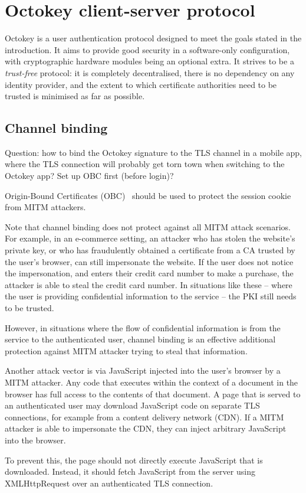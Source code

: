 \section{Octokey client-server protocol}

Octokey is a user authentication protocol designed to meet the goals stated in the introduction. It
aims to provide good security in a software-only configuration, with cryptographic hardware modules
being an optional extra. It strives to be a \emph{trust-free} protocol: it is completely
decentralised, there is no dependency on any identity provider, and the extent to which certificate
authorities need to be trusted is minimised as far as possible.

\subsection{Channel binding}

Question: how to bind the Octokey signature to the TLS channel in a mobile app, where the TLS
connection will probably get torn town when switching to the Octokey app? Set up OBC first (before
login)?

Origin-Bound Certificates (OBC)~\cite{Dietz12} should be used to protect the session cookie from
MITM attackers.

Note that channel binding does not protect against all MITM attack scenarios. For example, in an
e-commerce setting, an attacker who has stolen the website's private key, or who has fraudulently
obtained a certificate from a CA trusted by the user's browser, can still impersonate the website.
If the user does not notice the impersonation, and enters their credit card number to make a
purchase, the attacker is able to steal the credit card number. In situations like these -- where
the user is providing confidential information to the service -- the PKI still needs to be trusted.

However, in situations where the flow of confidential information is from the service to the
authenticated user, channel binding is an effective additional protection against MITM attacker
trying to steal that information.

Another attack vector is via JavaScript injected into the user's browser by a MITM attacker. Any
code that executes within the context of a document in the browser has full access to the contents
of that document. A page that is served to an authenticated user may download JavaScript code on
separate TLS connections, for example from a content delivery network (CDN). If a MITM attacker is
able to impersonate the CDN, they can inject arbitrary JavaScript into the browser.

To prevent this, the page should not directly execute JavaScript that is downloaded. Instead, it
should fetch JavaScript from the server using XMLHttpRequest over an authenticated TLS connection. 
